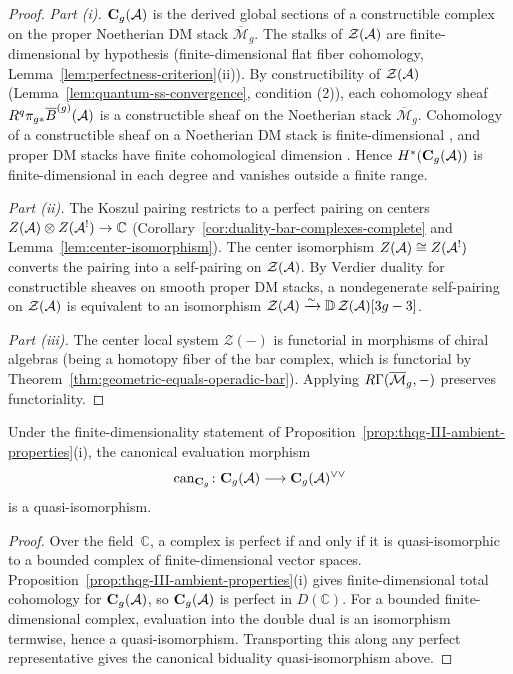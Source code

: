 \begin{proof}
\emph{Part (i).}
$\mathbf{C}_g(\mathcal{A})$ is the derived global sections of a
constructible complex on the proper Noetherian DM stack
$\overline{\mathcal{M}}_g$. The stalks of
$\mathcal{Z}(\mathcal{A})$ are finite-dimensional by hypothesis
(finite-dimensional flat fiber cohomology,
Lemma~\ref{lem:perfectness-criterion}(ii)).
By constructibility of $\mathcal{Z}(\mathcal{A})$
(Lemma~\ref{lem:quantum-ss-convergence}, condition (2)),
each cohomology sheaf $R^q\pi_{g*}\overline{B}^{(g)}(\mathcal{A})$
is a constructible sheaf on the Noetherian stack
$\overline{\mathcal{M}}_g$. Cohomology of a constructible
sheaf on a Noetherian DM stack is finite-dimensional
\cite[Theorem~18.1.1]{SAG}, and proper DM stacks have finite
cohomological dimension \cite[\S4.1]{Olsson16}. Hence
$H^*(\mathbf{C}_g(\mathcal{A}))$ is finite-dimensional in each degree and
vanishes outside a finite range.

\emph{Part (ii).}
The Koszul pairing restricts to a perfect pairing on centers
$Z(\mathcal{A}) \otimes Z(\mathcal{A}^!) \to \mathbb{C}$
(Corollary~\ref{cor:duality-bar-complexes-complete} and
Lemma~\ref{lem:center-isomorphism}).
The center isomorphism $Z(\mathcal{A}) \cong Z(\mathcal{A}^!)$ converts the
pairing into a self-pairing on $\mathcal{Z}(\mathcal{A})$.
By Verdier duality for constructible sheaves on smooth proper
DM stacks, a nondegenerate self-pairing on $\mathcal{Z}(\mathcal{A})$
is equivalent to an isomorphism
$\mathcal{Z}(\mathcal{A}) \xrightarrow{\sim}
\mathbb{D}\,\mathcal{Z}(\mathcal{A})[3g - 3]$.

\emph{Part (iii).}
The center local system $\mathcal{Z}(-)$ is functorial in
morphisms of chiral algebras (being a homotopy fiber of the
bar complex, which is functorial by
Theorem~\ref{thm:geometric-equals-operadic-bar}).
Applying $R\Gamma(\overline{\mathcal{M}}_g, -)$ preserves
functoriality.
\end{proof}

\begin{lemma}
\label{lem:thqg-III-ambient-biduality}
Under the finite-dimensionality statement of
Proposition~\ref{prop:thqg-III-ambient-properties}(i), the canonical
evaluation morphism
\[
\mathrm{can}_{\mathbf{C}_g}\colon
\mathbf{C}_g(\mathcal{A}) \longrightarrow \mathbf{C}_g(\mathcal{A})^{\vee\vee}
\]
is a quasi-isomorphism.
\end{lemma}

\begin{proof}
Over the field~$\mathbb{C}$, a complex is perfect if and only if it
is quasi-isomorphic to a bounded complex of finite-dimensional vector
spaces. Proposition~\ref{prop:thqg-III-ambient-properties}(i) gives
finite-dimensional total cohomology for $\mathbf{C}_g(\mathcal{A})$, so
$\mathbf{C}_g(\mathcal{A})$ is perfect in $D(\mathbb{C})$. For a bounded
finite-dimensional complex, evaluation into the double dual is an
isomorphism termwise, hence a quasi-isomorphism. Transporting this
along any perfect representative gives the canonical biduality
quasi-isomorphism above.
\end{proof}

